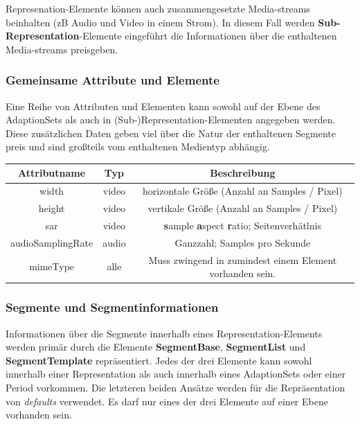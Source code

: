 \documentclass[paper = a4, fontsize = 12pt, parskip = half]{scrartcl} %
\begin{document}
Represenation-Elemente können auch zusammengesetzte Media-streams beinhalten (zB Audio und Video in einem Strom). In diesem Fall werden \textbf{Sub-Representation}-Elemente eingeführt die Informationen über die enthaltenen Media-streams preisgeben.

\subsubsection{Gemeinsame Attribute und Elemente}
Eine Reihe von Attributen und Elementen kann sowohl auf der Ebene des AdaptionSets als auch in (Sub-)Representation-Elementen angegeben werden. Diese zusätzlichen Daten geben viel über die Natur der enthaltenen Segmente preis und sind großteils vom enthaltenen Medientyp abhängig.

\begin{center}
    \begin{tabular}{| c | c | c |}
        \hline
         \textbf{Attributname} & \textbf{Typ} & \textbf{Beschreibung} \\
         \hline
         width & video & horizontale Größe (Anzahl an Samples / Pixel) \\
         \hline
         height & video & vertikale Größe (Anzahl an Samples / Pixel) \\
         \hline
         sar & video & \textbf{s}ample \textbf{a}spect \textbf{r}atio; Seitenverhätlnis \\
         \hline
         audioSamplingRate & audio & Ganzzahl; Samples pro Sekunde \\
         \hline
         mimeType & alle & Muss zwingend in zumindest einem Element vorhanden sein. \\ 
         \hline
    \end{tabular}
\end{center}

\subsubsection{Segmente und Segmentinformationen}
Informationen über die Segmente innerhalb eines Representation-Elements werden primär durch die Elemente \textbf{SegmentBase}, \textbf{SegmentList} und \textbf{SegmentTemplate} repräsentiert. Jedes der drei Elemente kann sowohl innerhalb einer Representation als auch innerhalb eines AdaptionSets oder einer Period vorkommen. Die letzteren beiden Ansätze werden für die Repräsentation von \textit{defaults} verwendet. Es darf nur eines der drei Elemente auf einer Ebene vorhanden sein.
\end{document}
